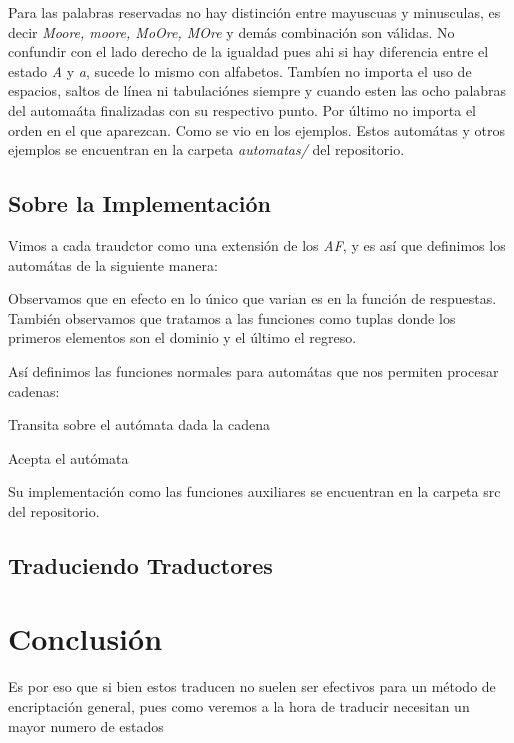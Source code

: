 \documentclass[11pt,letterpaper]{article}
\begin{document}
\begin{multicols}{2}
  Para las palabras reservadas no hay distinción entre mayuscuas y minusculas, es decir
  {\it Moore, moore, MoOre, MOre} y demás combinación son válidas. No confundir con
  el lado derecho de la igualdad pues ahi si hay diferencia entre el estado {\it A} y {\it a},
  sucede lo mismo con alfabetos. Tambíen no importa el uso de espacios, saltos de línea
  ni tabulaciónes siempre y cuando esten las ocho palabras del automaáta finalizadas con
  su respectivo punto. Por último no importa el orden en el que aparezcan. Como se vio en
  los ejemplos. Estos automátas y otros ejemplos se encuentran en la carpeta {\it automatas/}
  del repositorio.
  
  \subsection{Sobre la Implementación}

  Vimos a cada traudctor como una extensión de los {\it AF}, y es así que definimos los
  automátas de la siguiente manera:

  

  Observamos que en efecto en lo único
  que varian es en la función de respuestas.
  También observamos que tratamos a las funciones
  como tuplas donde los primeros elementos son
  el dominio y el último el regreso.
  
  Así definimos las funciones normales para automátas que nos permiten procesar cadenas:

  Transita sobre el autómata dada la cadena
  

  Acepta el autómata
  

  Su implementación como las funciones auxiliares se encuentran en la carpeta src
  del repositorio.

  \subsection{Traduciendo Traductores}

  
  \section{Conclusión}
  Es por eso que si bien estos traducen no suelen ser efectivos
  para un método de encriptación general, pues como veremos a la hora de traducir necesitan
  un mayor numero de estados

\end{multicols}
\end{document}
